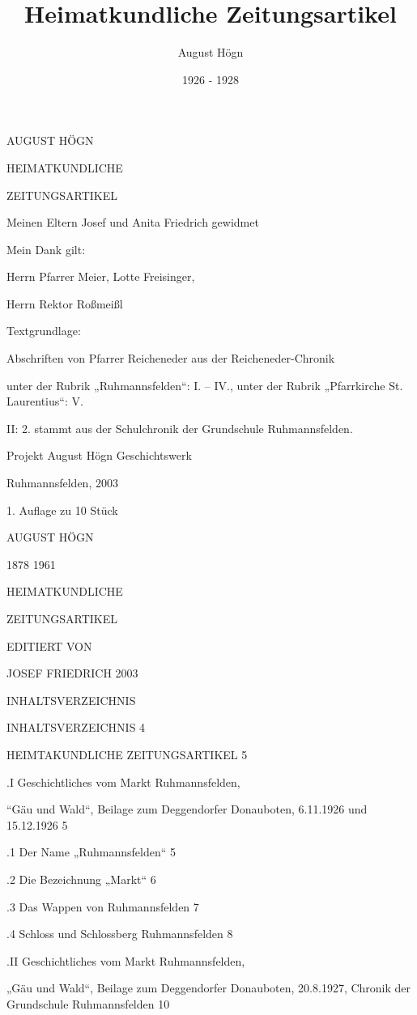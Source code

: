 \documentclass[12pt,a4paper]{book}
\author{August Högn}
\title{Heimatkundliche Zeitungsartikel}
\date{1926 - 1928}
\begin{document}
\maketitle

AUGUST HÖGN

HEIMATKUNDLICHE

ZEITUNGSARTIKEL

Meinen Eltern Josef und Anita Friedrich gewidmet


Mein Dank gilt:

Herrn Pfarrer Meier, Lotte Freisinger,

Herrn Rektor Roßmeißl


Textgrundlage:

Abschriften von Pfarrer Reicheneder aus der Reicheneder-Chronik

unter der Rubrik „Ruhmannsfelden“: I. – IV., unter der Rubrik „Pfarrkirche St.
Laurentius“: V.

II: 2. stammt aus der Schulchronik der Grundschule Ruhmannsfelden.


Projekt August Högn Geschichtswerk

Ruhmannsfelden, 2003

1. Auflage zu 10 Stück

AUGUST HÖGN

1878 1961


HEIMATKUNDLICHE

ZEITUNGSARTIKEL



EDITIERT VON

JOSEF FRIEDRICH 2003



INHALTSVERZEICHNIS

INHALTSVERZEICHNIS  4

HEIMTAKUNDLICHE ZEITUNGSARTIKEL 5

.I Geschichtliches vom Markt Ruhmannsfelden,

“Gäu und Wald“, Beilage zum Deggendorfer Donauboten, 6.11.1926 und 15.12.1926
5

.1 Der Name „Ruhmannsfelden“    5

.2 Die Bezeichnung „Markt“  6

.3 Das Wappen von Ruhmannsfelden    7

.4 Schloss und Schlossberg Ruhmannsfelden   8

.II Geschichtliches vom Markt Ruhmannsfelden,

„Gäu und Wald“, Beilage zum Deggendorfer Donauboten, 20.8.1927, Chronik der
Grundschule Ruhmannsfelden  10
\end{document}
